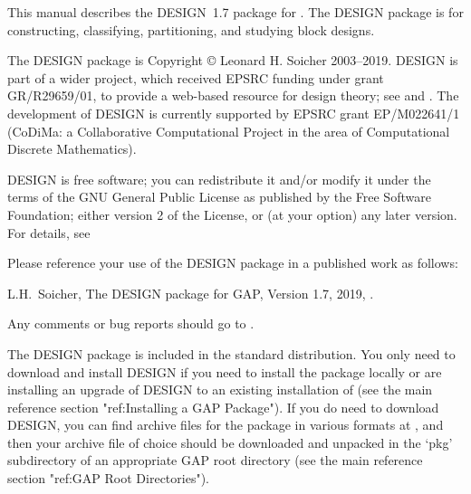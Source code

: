 %
%
%
%
\def\GRAPE{\sf GRAPE}
\def\DESIGN{\sf DESIGN}
\def\GAPDoc{\sf GAPDoc}
\def\nauty{\it nauty}
\def\Aut{{\rm Aut}\,} 


This manual describes the {\DESIGN}~1.7 package for {\GAP}.  The {\DESIGN}
package is for constructing, classifying, partitioning, and studying
block designs. 

The {\DESIGN} package is Copyright {\copyright} Leonard H. Soicher
2003--2019.  {\DESIGN} is part of a wider project, which received EPSRC
funding under grant GR/R29659/01, to provide a web-based resource for
design theory; see  and \cite{Dotw}.
The development of {\DESIGN} is currently supported by EPSRC grant
EP/M022641/1 (CoDiMa: a Collaborative Computational Project in the area
of Computational Discrete Mathematics).

{\DESIGN} is free software; you can redistribute it and/or modify
it under the terms of the GNU General Public License as published by
the Free Software Foundation; either version 2 of the License, or
(at your option) any later version. For details, see 

Please reference your use of the {\DESIGN} package in a published work
as follows:

L.H.~Soicher, The DESIGN package for GAP, Version 1.7, 2019,
.

Any comments or bug reports should go to
.


The {\DESIGN} package is included in the standard {\GAP}
distribution. You only need to download and install {\DESIGN} if you need
to install the package locally or are installing an upgrade of {\DESIGN}
to an existing installation of {\GAP} (see the main {\GAP} reference
section "ref:Installing a GAP Package").  If you do need to download
{\DESIGN}, you can find archive files for the package in various formats
at , and then your
archive file of choice should be downloaded and unpacked in the `pkg'
subdirectory of an appropriate GAP root directory (see the main {\GAP}
reference section "ref:GAP Root Directories").

